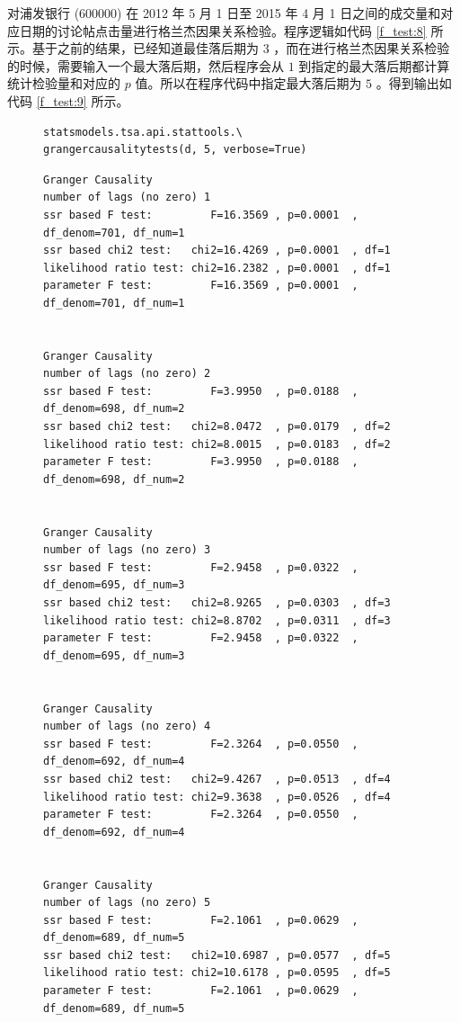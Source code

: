 对浦发银行 (600000) 在 2012 年 5 月 1 日至 2015 年 4 月 1 日之间的成交量和对应日期的讨论帖点击量进行格兰杰因果关系检验。程序逻辑如代码 \ref{f_test:8} 所示。基于之前的结果，已经知道最佳落后期为 $3$ ，而在进行格兰杰因果关系检验的时候，需要输入一个最大落后期，然后程序会从 $1$ 到指定的最大落后期都计算统计检验量和对应的 $p$ 值。所以在程序代码中指定最大落后期为 $5$ 。得到输出如代码 \ref{f_test:9} 所示。

\begin{figure}
  \begin{minipage}{\textwidth}
    \begin{lstlisting}[caption=浦发银行 (600000) 成交量与讨论帖点击量格兰杰因果关系检验, label=f_test:8]
statsmodels.tsa.api.stattools.\
grangercausalitytests(d, 5, verbose=True)
    \end{lstlisting}
  \end{minipage}
\end{figure}

\begin{figure}
  \begin{minipage}{\textwidth}
    \begin{lstlisting}[caption=浦发银行 (600000) 成交量与讨论帖点击量格兰杰因果关系检验结果, label=f_test:9]
Granger Causality
number of lags (no zero) 1
ssr based F test:         F=16.3569 , p=0.0001  , df_denom=701, df_num=1
ssr based chi2 test:   chi2=16.4269 , p=0.0001  , df=1
likelihood ratio test: chi2=16.2382 , p=0.0001  , df=1
parameter F test:         F=16.3569 , p=0.0001  , df_denom=701, df_num=1


Granger Causality
number of lags (no zero) 2
ssr based F test:         F=3.9950  , p=0.0188  , df_denom=698, df_num=2
ssr based chi2 test:   chi2=8.0472  , p=0.0179  , df=2
likelihood ratio test: chi2=8.0015  , p=0.0183  , df=2
parameter F test:         F=3.9950  , p=0.0188  , df_denom=698, df_num=2


Granger Causality
number of lags (no zero) 3
ssr based F test:         F=2.9458  , p=0.0322  , df_denom=695, df_num=3
ssr based chi2 test:   chi2=8.9265  , p=0.0303  , df=3
likelihood ratio test: chi2=8.8702  , p=0.0311  , df=3
parameter F test:         F=2.9458  , p=0.0322  , df_denom=695, df_num=3


Granger Causality
number of lags (no zero) 4
ssr based F test:         F=2.3264  , p=0.0550  , df_denom=692, df_num=4
ssr based chi2 test:   chi2=9.4267  , p=0.0513  , df=4
likelihood ratio test: chi2=9.3638  , p=0.0526  , df=4
parameter F test:         F=2.3264  , p=0.0550  , df_denom=692, df_num=4


Granger Causality
number of lags (no zero) 5
ssr based F test:         F=2.1061  , p=0.0629  , df_denom=689, df_num=5
ssr based chi2 test:   chi2=10.6987 , p=0.0577  , df=5
likelihood ratio test: chi2=10.6178 , p=0.0595  , df=5
parameter F test:         F=2.1061  , p=0.0629  , df_denom=689, df_num=5
    \end{lstlisting}
  \end{minipage}
\end{figure}

